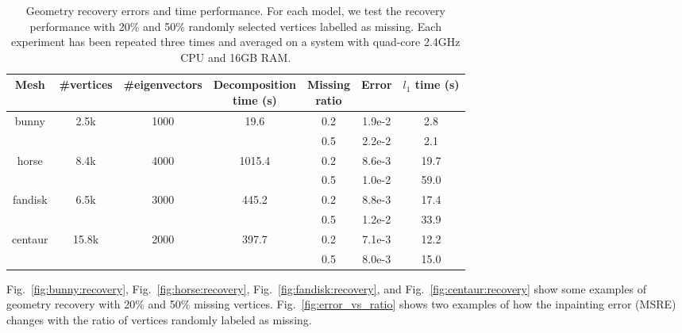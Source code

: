 \begin{table}
\centering
  \begin{tabular}{|c|c|c|c|c|c|c|}
  \hline
  Mesh                     & \#vertices                 & \#eigenvectors          & \pbox{20cm}{Decomposition\\ time (s)}        & \pbox{15cm}{Missing\\ ratio} & Error  & $l_1$ time (s) \\
  \hline
  \multirow{2}{3em}{bunny} & \multirow{2}{4em}{2.5k}    & \multirow{2}{5em}{1000} & \multirow{2}{5em}{19.6}   & 0.2          & 1.9e-2 & 2.8       \\
                           &                            &                         &                           & 0.5           & 2.2e-2 & 2.1       \\

  \hline
  \multirow{2}{3em}{horse} & \multirow{2}{4em}{8.4k}    & \multirow{2}{5em}{4000} & \multirow{2}{5em}{1015.4} & 0.2          & 8.6e-3 & 19.7      \\
                           &                            &                         &                           & 0.5           & 1.0e-2 & 59.0      \\
  \hline
  \multirow{2}{3em}{fandisk} & \multirow{2}{4em}{6.5k} & \multirow{2}{5em}{3000} & \multirow{2}{5em}{445.2}   & 0.2          & 8.8e-3 & 17.4      \\
                             &                          &                         &                           & 0.5           & 1.2e-2 & 33.9      \\
  \hline
  \multirow{2}{3em}{centaur} & \multirow{2}{4em}{15.8k} & \multirow{2}{5em}{2000} & \multirow{2}{5em}{397.7}  & 0.2          & 7.1e-3 & 12.2      \\
                             &                          &                         &                           & 0.5           & 8.0e-3 & 15.0      \\
  \hline
  \end{tabular}
\caption[Geometry recovery errors and time performance.]
{Geometry recovery errors and time performance. For each model, we test the recovery performance with
20\% and 50\% randomly selected vertices labelled as missing. Each experiment has been repeated three times
and averaged on a system with quad-core 2.4GHz CPU and 16GB RAM. }
\label{tab:recovery}
\end{table}

Fig.~\ref{fig:bunny:recovery}, Fig.~\ref{fig:horse:recovery}, Fig.~\ref{fig:fandisk:recovery}, and Fig.~\ref{fig:centaur:recovery}
show some examples of geometry recovery with 20\% and 50\%  missing vertices. Fig.~\ref{fig:error_vs_ratio} shows
two examples of how the inpainting error (MSRE) changes with the ratio of vertices randomly labeled as missing. 

